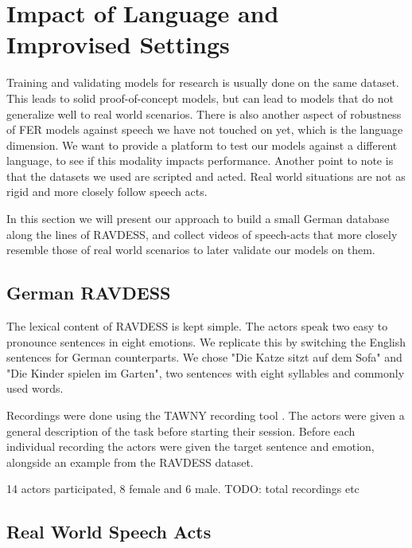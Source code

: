 \section{Impact of Language and Improvised Settings}
\label{sec:data}
Training and validating models for research is usually done on the same dataset. This leads to solid proof-of-concept models, but can lead to models that do not generalize well to real world scenarios. There is also another aspect of robustness of FER models against speech we have not touched on yet, which is the language dimension. We want to provide a platform to test our models against a different language, to see if this modality impacts performance. Another point to note is that the datasets we used are scripted and acted. Real world situations are not as rigid and more closely follow speech acts.

In this section we will present our approach to build a small German database along the lines of RAVDESS, and collect videos of speech-acts that more closely resemble those of real world scenarios to later validate our models on them.

\subsection{German RAVDESS}

The lexical content of RAVDESS is kept simple. The actors speak two easy to pronounce sentences in eight emotions. We replicate this by switching the English sentences for German counterparts. We chose "Die Katze sitzt auf dem Sofa" and "Die Kinder spielen im Garten", two sentences with eight syllables and commonly used words. 

Recordings were done using the TAWNY recording tool \cite{tawny2021}. The actors were given a general description of the task before starting their session. Before each individual recording the actors were given the target sentence and emotion, alongside an example from the RAVDESS dataset.

14 actors participated, 8 female and 6 male. TODO: total recordings etc

\subsection{Real World Speech Acts}
